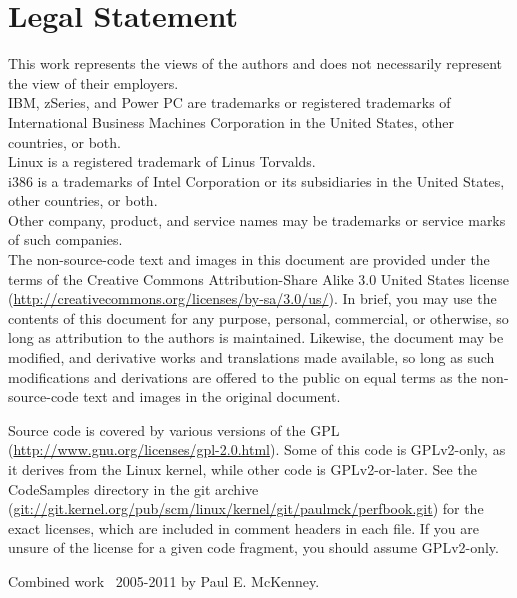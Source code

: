 
\section*{Legal Statement}

{ \small
This work represents the views of the authors and does not necessarily
represent the view of their employers.\\
IBM, zSeries, and Power PC are trademarks or registered trademarks of
International Business Machines Corporation in the United States,
other countries, or both.\\
Linux is a registered trademark of Linus Torvalds.\\
i386 is a trademarks of Intel Corporation or its
subsidiaries in the United States, other countries, or both. \\
Other company, product, and service names may be trademarks or service marks
of such companies.\\

The non-source-code text and images in this document are provided under
the terms of the Creative Commons Attribution-Share Alike 3.0 United
States license
(\url{http://creativecommons.org/licenses/by-sa/3.0/us/}).
In brief, you may use the contents of this document for any purpose,
personal, commercial, or otherwise, so long as attribution to the
authors is maintained.  Likewise, the document may be modified,
and derivative works and translations made available, so long as
such modifications and derivations are offered to the public on equal
terms as the non-source-code text and images in the original document.

Source code is covered by various versions of the GPL
(\url{http://www.gnu.org/licenses/gpl-2.0.html}).
Some of this code is GPLv2-only, as it derives from the Linux kernel,
while other code is GPLv2-or-later.
See the CodeSamples directory in the git archive
(\url{git://git.kernel.org/pub/scm/linux/kernel/git/paulmck/perfbook.git})
for the exact licenses, which are included in comment headers in each file.
If you are unsure of the license for a given code fragment,
you should assume GPLv2-only.

Combined work {\textcopyright}~2005-2011 by Paul E. McKenney.
}
